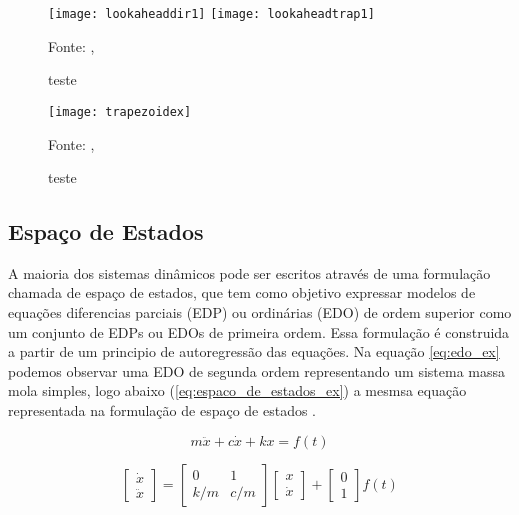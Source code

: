\begin{figure}[!htb]
    \centering
    \caption{teste}
    \texttt{[image: lookaheaddir1]}
    \texttt{[image: lookaheadtrap1]}

    {\footnotesize Fonte: \citeauthor{klipperkinematic}, \citeyear{klipperkinematic}}
    \label{fig:label9}
\end{figure}


\begin{figure}[!htb]
    \centering
    \caption{teste}
    \texttt{[image: trapezoidex]}

    {\footnotesize Fonte: \citeauthor{klipperkinematic}, \citeyear{klipperkinematic}}
    \label{fig:label9}
\end{figure}


\subsection{Espaço de Estados}

A maioria dos sistemas dinâmicos pode ser escritos através de uma formulação
chamada de espaço de estados, que tem como objetivo expressar modelos 
de equações diferencias parciais (EDP) ou ordinárias (EDO) de ordem superior
como um conjunto de EDPs ou EDOs de primeira ordem.
Essa formulação é construida a partir de um principio de autoregressão
das equações. Na equação \ref{eq:edo_ex} podemos observar uma EDO de segunda ordem representando
um sistema massa mola simples,
logo abaixo (\ref{eq:espaco_de_estados_ex}) a mesmsa equação representada na formulação
de espaço de estados \cite{hamilton94}.

\begin{equation}
    \label{eq:edo_ex}
    m \ddot x+c \dot x+kx = f(t)
\end{equation}

\begin{equation}
    \label{eq:espaco_de_estados_ex}
    \begin{bmatrix}
        \dot x \\
        \ddot x
    \end{bmatrix}
    =
    \begin{bmatrix}
        0 & 1 \\
        k/m & c/m
    \end{bmatrix}
    \begin{bmatrix}
        x \\
        \dot x
    \end{bmatrix}
    +
    \begin{bmatrix}
        0 \\
        1
    \end{bmatrix}
    f(t)
\end{equation}

